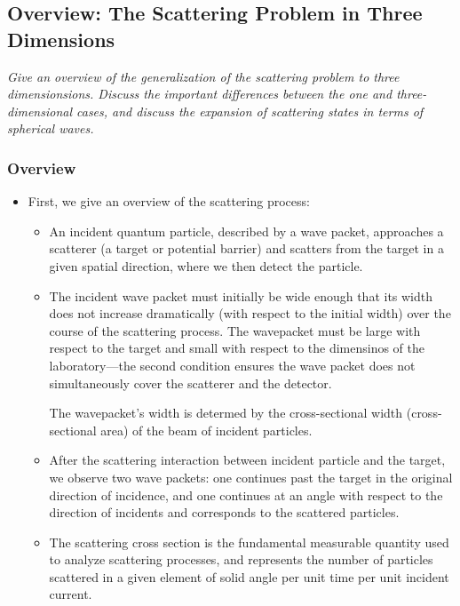 \documentclass[11pt, a4paper]{article}
\begin{document}
\subsection{Overview: The Scattering Problem in Three Dimensions}
\textit{Give an overview of the generalization of the scattering problem to three dimensionsions. Discuss the important differences between the one and three-dimensional cases, and discuss the expansion of scattering states in terms of spherical waves.}

\subsubsection{Overview}

\begin{itemize}
    \item First, we give an overview of the scattering process:
    \begin{itemize}
        \item An incident quantum particle, described by a wave packet, approaches a scatterer (a target or potential barrier) and scatters from the target in a given spatial direction, where we then detect the particle.

        \item The incident wave packet must initially be wide enough that its width does not increase dramatically (with respect to the initial width) over the course of the scattering process. The wavepacket must be large with respect to the target and small with respect to the dimensinos of the laboratory---the second condition ensures the wave packet does not simultaneously cover the scatterer and the detector. 

        The wavepacket's width is determed by the cross-sectional width (cross-sectional area) of the beam of incident particles. 

        \item After the scattering interaction between incident particle and the target, we observe two wave packets: one continues past the target in the original direction of incidence, and one continues at an angle with respect to the direction of incidents and corresponds to the scattered particles. 

        \item The scattering cross section is the fundamental measurable quantity used to analyze scattering processes, and represents the number of particles scattered in a given element of solid angle per unit time per unit incident current.


\end{itemize}
\end{itemize}
\end{document}
